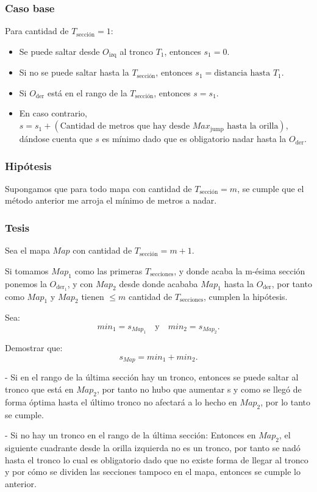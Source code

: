 \documentclass{article}
\begin{document}
\subsubsection*{Caso base}
Para cantidad de $T_{\text{sección}} = 1$:
\begin{itemize}
    \item Se puede saltar desde $O_{\text{izq}}$ al tronco $T_1$, entonces $s_1 = 0$.
    \item Si no se puede saltar hasta la $T_{\text{sección}}$, entonces $s_1 = \text{distancia hasta } T_1$.
    \item Si $O_{\text{der}}$ está en el rango de la $T_{\text{sección}}$, entonces $s = s_1$.
    \item En caso contrario, $s = s_1 + (\text{Cantidad de metros que hay desde } Max_{\text{jump}} \text{ hasta la orilla})$, dándose cuenta que $s$ es mínimo dado que es obligatorio nadar hasta la $O_{\text{der}}$.
\end{itemize}

\subsubsection*{Hipótesis}
Supongamos que para todo mapa con cantidad de $T_{\text{sección}} = m$, se cumple que el método anterior me arroja el mínimo de metros a nadar.

\subsubsection*{Tesis}
Sea el mapa $Map$ con cantidad de $T_{\text{sección}} = m + 1$. 

Si tomamos $Map_1$ como las primeras $T_{\text{secciones}}$, y donde acaba la m-ésima sección ponemos la $O_{\text{der}_1}$, y con $Map_2$ desde donde acababa $Map_1$ hasta la $O_{\text{der}}$, por tanto como $Map_1$ y $Map_2$ tienen $\leq m$ cantidad de $T_{\text{secciones}}$, cumplen la hipótesis.

Sea:
\[
min_1 = s_{Map_1} \quad \text{y} \quad min_2 = s_{Map_2}.
\]

Demostrar que:
\[
s_{Map} = min_1 + min_2.
\]

- Si en el rango de la última sección hay un tronco, entonces se puede saltar al tronco que está en $Map_2$, por tanto no hubo que aumentar s y como se llegó de forma óptima hasta el último tronco no afectará a lo hecho en $Map_2$, por lo tanto se cumple.

- Si no hay un tronco en el rango de la última sección:
Entonces en $Map_2$, el siguiente cuadrante desde la orilla izquierda no es un tronco, por tanto se nadó hasta el tronco lo cual es obligatorio dado que no existe forma de llegar al tronco y por cómo se dividen las secciones tampoco en el mapa, entonces se cumple lo anterior.
\end{document}
